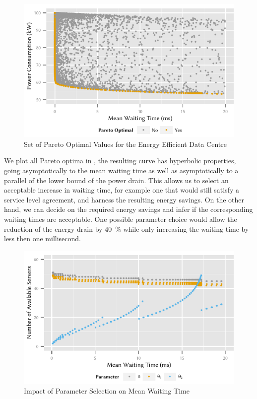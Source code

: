 \begin{figure}
  \centering
  \includegraphics{cloud/data_centers/performance_evaluation/figures/energy_vs_waiting_pareto}
  \caption{Set of Pareto Optimal Values for the Energy Efficient Data Centre}
  \label{fig:cloud:data_centers:performance_evaluation:energy_vs_waiting_pareto}
\end{figure}

We plot all Pareto optima in , the resulting curve has hyperbolic properties, going asymptotically to the mean waiting time as well as asymptotically to a parallel of the lower bound of the power drain.
This allows us to select an acceptable increase in waiting time, for example one that would still satisfy a service level agreement, and harness the resulting energy savings.
On the other hand, we can decide on the required energy savings and infer if the corresponding waiting times are acceptable.
One possible parameter choice would allow the reduction of the energy drain by \SI{40}{\percent} while only increasing the waiting time by less then one millisecond.

\begin{figure}
  \centering
  \includegraphics{cloud/data_centers/performance_evaluation/figures/sorted_results}
  \caption{Impact of Parameter Selection on Mean Waiting Time}
  \label{fig:cloud:data_centers:performance_evaluation:sorted_results}
\end{figure}

